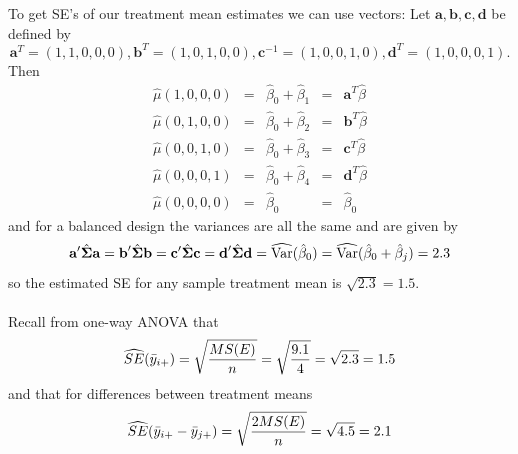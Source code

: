 To get SE's of our treatment mean estimates we can use vectors:  Let $\textbf{a},\textbf{b},\textbf{c},\textbf{d}$ be defined by 
$$\textbf{a}^{T}=(1,1,0,0,0), \textbf{b}^{T}=(1,0,1,0,0), \textbf{c}^{-1}=(1,0,0,1,0), \textbf{d}^{T}=(1,0,0,0,1).$$
Then
\[
\begin{array}{lclcl}
\hat\mu(1,0,0,0) & = & \hat\beta_0  + \hat\beta_1 & = & \textbf{a}^{T}\hat\beta \\
\hat\mu(0,1,0,0) & = & \hat\beta_0  + \hat\beta_2 & = & \textbf{b}^{T}\hat\beta \\
\hat\mu(0,0,1,0) & = & \hat\beta_0  + \hat\beta_3 & = & \textbf{c}^{T}\hat\beta \\
\hat\mu(0,0,0,1) & = & \hat\beta_0  + \hat\beta_4 & = & \textbf{d}^{T}\hat\beta \\
\hat\mu(0,0,0,0) & = & \hat\beta_0  & = & \hat\beta_0 
\end{array}
\]
and for a balanced design the variances are all the same and are given by
$$\textbf{a}' \hat{\boldsymbol{\Sigma}} \textbf{a} = \textbf{b}' \hat{\boldsymbol{\Sigma}} \textbf{b} = \textbf{c}' \hat{\boldsymbol{\Sigma}} \textbf{c} = \textbf{d}' \hat{\boldsymbol{\Sigma}} \textbf{d} = \widehat{\mbox{Var}}(\hat\beta_0) = \widehat{\mbox{Var}}(\hat\beta_0 + \hat\beta_j) = 2.3$$
so the estimated SE for any sample treatment mean is $\sqrt{2.3}=1.5$.\\~\\

Recall from one-way ANOVA that 
$$\widehat{SE}(\bar{y}_{i +}) = \sqrt{\frac{MS(E)}{n}} = \sqrt{\frac{9.1}{4}} = \sqrt{2.3} = 1.5$$
and that for differences between treatment means 
$$\widehat{SE}(\bar{y}_{i +}-\bar{y}_{j +})=\sqrt{\frac{2MS(E)}{n}}=\sqrt{4.5} = 2.1$$
~\\

